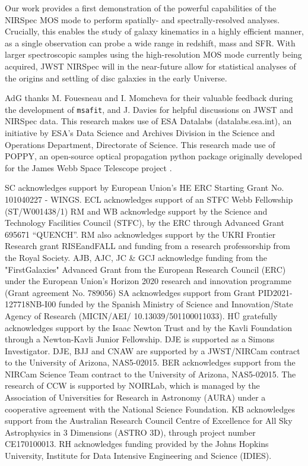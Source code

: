 \documentclass[longauth]{aa}
\begin{document}
Our work provides a first demonstration of the powerful capabilities of the NIRSpec MOS mode to perform spatially- and spectrally-resolved analyses. Crucially, this enables the study of galaxy kinematics in a highly efficient manner, as a single observation can probe a wide range in redshift, mass and SFR. With larger spectroscopic samples using the high-resolution MOS mode currently being acquired, JWST NIRSpec will in the near-future allow for statistical analyses of the origins and settling of disc galaxies in the early Universe.












\begin{acknowledgements}
    AdG thanks M. Fouesneau and I. Momcheva for their valuable feedback during the development of \texttt{msafit}, and J. Davies for helpful discussions on JWST and NIRSpec data. This research makes use of ESA Datalabs (datalabs.esa.int), an initiative by ESA’s Data Science and Archives Division in the Science and Operations Department, Directorate of Science. This research made use of POPPY, an open-source optical propagation python package originally developed for the James Webb Space Telescope project \citep{Perrin2012}.

SC acknowledges support by European Union’s HE ERC Starting Grant No. 101040227 - WINGS. ECL acknowledges support of an STFC Webb Fellowship (ST/W001438/1)
RM and WB acknowledge support by the Science and Technology Facilities Council (STFC), by the ERC through Advanced Grant 695671 “QUENCH”. RM also acknowledges support by the UKRI Frontier Research grant RISEandFALL and funding from a research professorship from the Royal Society.
 AJB, AJC, JC \& GCJ acknowledge funding from the "FirstGalaxies" Advanced Grant from the European Research Council (ERC) under the European Union’s Horizon 2020 research and innovation programme (Grant agreement No. 789056)
 SA acknowledges support from Grant PID2021-127718NB-I00 funded by the Spanish Ministry of Science and Innovation/State Agency of Research (MICIN/AEI/ 10.13039/501100011033). 
H{\"U} gratefully acknowledges support by the Isaac Newton Trust and by the Kavli Foundation through a Newton-Kavli Junior Fellowship.
 DJE is supported as a Simons Investigator. DJE, BJJ and CNAW are supported by a JWST/NIRCam contract to the University of Arizona, NAS5-02015.
BER acknowledges support from the NIRCam Science Team contract to the University of Arizona, NAS5-02015. 
The research of CCW is supported by NOIRLab, which is managed by the Association of Universities for Research in Astronomy (AURA) under a cooperative agreement with the National Science Foundation.
KB acknowledges support from the Australian Research Council Centre of Excellence for All Sky Astrophysics in 3 Dimensions (ASTRO 3D), through project number CE170100013. RH acknowledges funding provided by the Johns Hopkins University, Institute for Data Intensive Engineering and Science (IDIES).
 
\end{acknowledgements}
\end{document}
